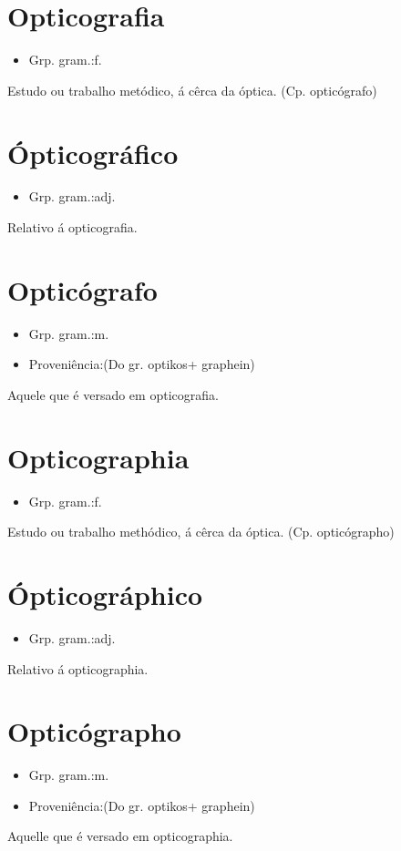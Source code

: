 \section{Opticografia}
\begin{itemize}
\item {Grp. gram.:f.}
\end{itemize}
Estudo ou trabalho metódico, á cêrca da óptica.
(Cp. \textunderscore opticógrafo\textunderscore )
\section{Ópticográfico}
\begin{itemize}
\item {Grp. gram.:adj.}
\end{itemize}
Relativo á \textunderscore opticografia\textunderscore .
\section{Opticógrafo}
\begin{itemize}
\item {Grp. gram.:m.}
\end{itemize}
\begin{itemize}
\item {Proveniência:(Do gr. \textunderscore optikos\textunderscore  + \textunderscore graphein\textunderscore )}
\end{itemize}
Aquele que é versado em opticografia.
\section{Opticographia}
\begin{itemize}
\item {Grp. gram.:f.}
\end{itemize}
Estudo ou trabalho methódico, á cêrca da óptica.
(Cp. \textunderscore opticógrapho\textunderscore )
\section{Ópticográphico}
\begin{itemize}
\item {Grp. gram.:adj.}
\end{itemize}
Relativo á \textunderscore opticographia\textunderscore .
\section{Opticógrapho}
\begin{itemize}
\item {Grp. gram.:m.}
\end{itemize}
\begin{itemize}
\item {Proveniência:(Do gr. \textunderscore optikos\textunderscore  + \textunderscore graphein\textunderscore )}
\end{itemize}
Aquelle que é versado em opticographia.
